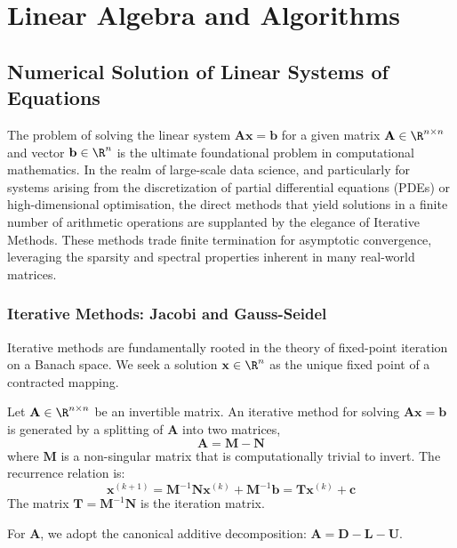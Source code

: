 \chapter{Linear Algebra and Algorithms}

\section{Numerical Solution of Linear Systems of Equations}

The problem of solving the linear system $\mathbf{A}\mathbf{x} = \mathbf{b}$ for a given matrix $\mathbf{A} \in \R^{n \times n}$ and vector $\mathbf{b} \in \R^n$ is the ultimate foundational problem in computational mathematics. In the realm of large-scale data science, and particularly for systems arising from the discretization of partial differential equations (PDEs) or high-dimensional optimisation, the direct methods that yield solutions in a finite number of arithmetic operations are supplanted by the elegance of Iterative Methods. These methods trade finite termination for asymptotic convergence, leveraging the sparsity and spectral properties inherent in many real-world matrices.

\subsection{Iterative Methods: Jacobi and Gauss-Seidel}

Iterative methods are fundamentally rooted in the theory of fixed-point iteration on a Banach space. We seek a solution $\mathbf{x} \in \R^n$ as the unique fixed point of a contracted mapping.

\begin{definition}
Let $\mathbf{A} \in \R^{n \times n}$ be an invertible matrix. An iterative method for solving $\mathbf{A}\mathbf{x} = \mathbf{b}$ is generated by a splitting of $\mathbf{A}$ into two matrices,
\[ \mathbf{A} = \mathbf{M} - \mathbf{N} \]
where $\mathbf{M}$ is a non-singular matrix that is computationally trivial to invert. The recurrence relation is:
\[ \mathbf{x}^{(k+1)} = \mathbf{M}^{-1}\mathbf{N}\mathbf{x}^{(k)} + \mathbf{M}^{-1}\mathbf{b} = \mathbf{T}\mathbf{x}^{(k)} + \mathbf{c} \]
The matrix $\mathbf{T} = \mathbf{M}^{-1}\mathbf{N}$ is the iteration matrix.
\end{definition}

For $\mathbf{A}$, we adopt the canonical additive decomposition: $\mathbf{A} = \mathbf{D} - \mathbf{L} - \mathbf{U}$.

